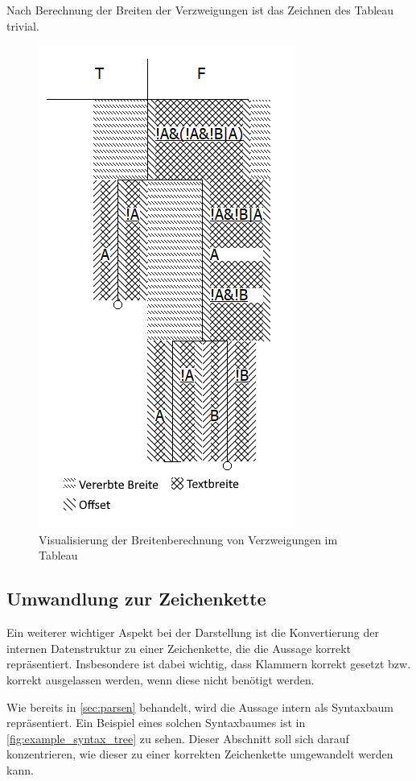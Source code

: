 Nach Berechnung der Breiten der Verzweigungen ist das Zeichnen des Tableau trivial.

\begin{figure}[H]
\begin{center}
\includegraphics[scale=1]{images/drawing_logic_calc_widths.png}
\caption{Visualisierung der Breitenberechnung von Verzweigungen im Tableau}
\label{fig:drawing_logic_calc_widths}
\end{center}
\end{figure}

\subsection{Umwandlung zur Zeichenkette}
Ein weiterer wichtiger Aspekt bei der Darstellung ist die Konvertierung der internen Datenstruktur zu einer Zeichenkette, die die Aussage korrekt repräsentiert. Insbesondere ist dabei wichtig, dass Klammern korrekt gesetzt bzw. korrekt ausgelassen werden, wenn diese nicht benötigt werden.

Wie bereits in \autoref{sec:parsen} behandelt, wird die Aussage intern als Syntaxbaum repräsentiert. Ein Beispiel eines solchen Syntaxbaumes ist in \autoref{fig:example_syntax_tree} zu sehen. Dieser Abschnitt soll sich darauf konzentrieren, wie dieser zu einer korrekten Zeichenkette umgewandelt werden kann.


